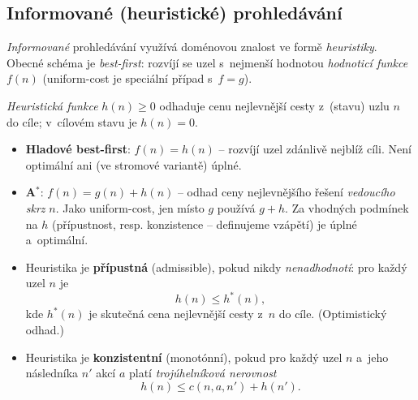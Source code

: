 \subsection{Informované (heuristické) prohledávání}

\emph{Informované} prohledávání využívá doménovou znalost ve formě \emph{heuristiky}. Obecné schéma je \emph{best-first}: rozvíjí se uzel s~nejmenší hodnotou \emph{hodnoticí funkce} $f(n)$ (uniform-cost je speciální případ s~$f=g$).

\begin{definice}
\emph{Heuristická funkce} $h(n)\ge 0$ odhaduje cenu nejlevnější cesty z~(stavu) uzlu $n$ do cíle; v~cílovém stavu je $h(n)=0$.
\begin{itemize}
  \item \textbf{Hladové best-first}: $f(n)=h(n)$ -- rozvíjí uzel zdánlivě nejblíž cíli. Není optimální ani (ve stromové variantě) úplné.
  \item \textbf{A${}^\ast$}: $f(n)=g(n)+h(n)$ -- odhad ceny nejlevnějšího řešení \emph{vedoucího skrz} $n$. Jako uniform-cost, jen místo $g$ používá $g+h$. Za vhodných podmínek na $h$ (přípustnost, resp. konzistence -- definujeme vzápětí) je úplné a~optimální.
\end{itemize}
\end{definice}

\begin{definice}
\begin{itemize}
  \item Heuristika je \textbf{přípustná} (admissible), pokud nikdy \emph{nenadhodnotí}: pro každý uzel $n$ je
  \[ h(n) \le h^\ast(n), \]
  kde $h^\ast(n)$ je skutečná cena nejlevnější cesty z~$n$ do cíle. (Optimistický odhad.)
  \item Heuristika je \textbf{konzistentní} (monotónní), pokud pro každý uzel $n$ a~jeho následníka $n'$ akcí $a$ platí \emph{trojúhelníková nerovnost}
  \[ h(n) \le c(n,a,n') + h(n'). \]
\end{itemize}
\end{definice}

\begin{center}
\end{center}

